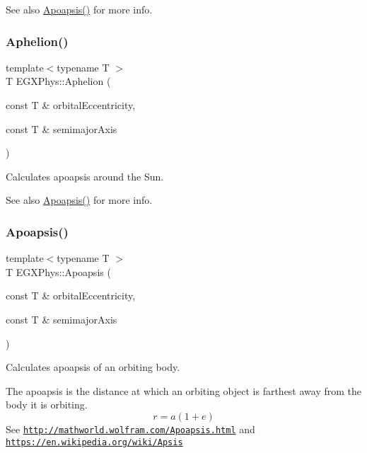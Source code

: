 \begin{DoxySeeAlso}{See also}
\hyperlink{group___astrophysics_gaf962e650bf84a568458e8eb39b1c61ba}{Apoapsis()} for more info. 
\end{DoxySeeAlso}
\mbox{\label{group___astrophysics_ga77dadb4d082a441c8e85203c983722c7}} 
\subsubsection{\texorpdfstring{Aphelion()}{Aphelion()}}
{\footnotesize\ttfamily template$<$typename T $>$ \\
T E\+G\+X\+Phys\+::\+Aphelion (\begin{DoxyParamCaption}\item[{const T \&}]{orbital\+Eccentricity,  }\item[{const T \&}]{semimajor\+Axis }\end{DoxyParamCaption})}



Calculates apoapsis around the Sun. 

\begin{DoxySeeAlso}{See also}
\hyperlink{group___astrophysics_gaf962e650bf84a568458e8eb39b1c61ba}{Apoapsis()} for more info. 
\end{DoxySeeAlso}
\mbox{\label{group___astrophysics_gaf962e650bf84a568458e8eb39b1c61ba}} 
\subsubsection{\texorpdfstring{Apoapsis()}{Apoapsis()}}
{\footnotesize\ttfamily template$<$typename T $>$ \\
T E\+G\+X\+Phys\+::\+Apoapsis (\begin{DoxyParamCaption}\item[{const T \&}]{orbital\+Eccentricity,  }\item[{const T \&}]{semimajor\+Axis }\end{DoxyParamCaption})}



Calculates apoapsis of an orbiting body. 

The apoapsis is the distance at which an orbiting object is farthest away from the body it is orbiting. \[r=a(1+e)\] See \href{http://mathworld.wolfram.com/Apoapsis.html}{\tt http\+://mathworld.\+wolfram.\+com/\+Apoapsis.\+html} and \href{https://en.wikipedia.org/wiki/Apsis}{\tt https\+://en.\+wikipedia.\+org/wiki/\+Apsis}


